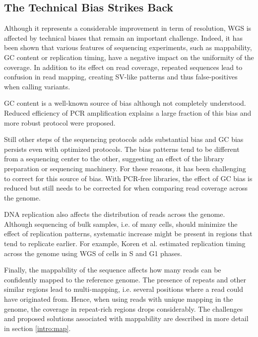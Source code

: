 \subsection{The Technical Bias Strikes Back}
Although it represents a considerable improvement in term of resolution, WGS is affected by technical biases that remain an important challenge.
Indeed, it has been shown that various features of sequencing experiments, such as mappability, GC content or replication timing, have a negative impact on the uniformity of the coverage\cite{Treangen2011,Teo2012,Benjamini2012,Koren2014,Cheung2011}.
In addition to its effect on read coverage, repeated sequences lead to confusion in read mapping, creating SV-like patterns and thus false-positives when calling variants.

GC content is a well-known source of bias although not completely understood.
Reduced efficiency of PCR amplification explains a large fraction of this bias and more robust protocol were proposed\cite{Aird2011,Kozarewa2009}.
\begin{comment}
  \citet{Aird2011} improved PCR protocol by using longer denaturation steps, different temperature for primer annealing, different reagents/polymerase.
  \citet{Kozarewa2009} introduced a PCR-free protocols where the amplification is performed after cluster formation rather than before (I think).
\end{comment}
Still other steps of the sequencing protocols adds substantial bias and GC bias persists even with optimized protocols\cite{Aird2011}.
The bias patterns tend to be different from a sequencing center to the other\cite{Benjamini2012}, suggesting an effect of the library preparation or sequencing machinery.
For these reasons, it has been challenging to correct for this source of bias.
With PCR-free libraries, the effect of GC bias is reduced but still needs to be corrected for when comparing read coverage across the genome.

DNA replication also affects the distribution of reads across the genome.
Although sequencing of bulk samples, i.e. of many cells, should minimize the effect of replication patterns, systematic increase might be present in regions that tend to replicate earlier.
For example, Koren et al. estimated replication timing across the genome using WGS of cells in S and G1 phases\cite{Koren2012}.

Finally, the mappability of the sequence affects how many reads can be confidently mapped to the reference genome.
The presence of repeats and other similar regions lead to multi-mapping, i.e. several positions where a read could have originated from.
Hence, when using reads with unique mapping in the genome, the coverage in repeat-rich regions drops considerably.
The challenges and proposed solutions associated with mappability are described in more detail in section \ref{intro:map}.

